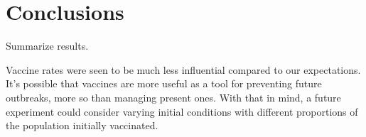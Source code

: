 \documentclass[12pt,a4paper]{article}
\begin{document}
\section{Conclusions}\label{section4}

Summarize results.



Vaccine rates were seen to be much less influential compared to our expectations. It's possible that vaccines are more useful as a tool for preventing future outbreaks, more so than managing present ones. With that in mind, a future experiment could consider varying initial conditions with different proportions of the population initially vaccinated.







\end{document}
